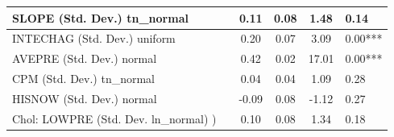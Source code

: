 \begin{table}
\begin{center}
\begin{tabular}{|l|l|c|c|c|l|}
			\hline
			SLOPE (Std. Dev.) tn_normal &  & 0.11 & 0.08 & 1.48 & 0.14 \\
			\hline
			INTECHAG (Std. Dev.) uniform &  & 0.20 & 0.07 & 3.09 & 0.00*** \\
			\hline
			AVEPRE (Std. Dev.) normal &  & 0.42 & 0.02 & 17.01 & 0.00*** \\
			\hline
			CPM (Std. Dev.) tn_normal &  & 0.04 & 0.04 & 1.09 & 0.28 \\
			\hline
			HISNOW (Std. Dev.) normal &  & -0.09 & 0.08 & -1.12 & 0.27 \\
			\hline
			 Chol: LOWPRE (Std. Dev. ln_normal) ) &  & 0.10 & 0.08 & 1.34 & 0.18 \\
			\hline
		\end{tabular}
	\end{center}
\end{table}